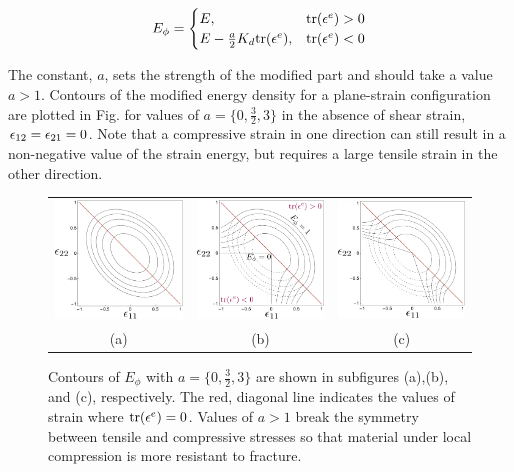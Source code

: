 \begin{align}\label{eq:modified_strain_energy_density}
	E_{\phi} = 
	\begin{cases}
	E, & \text{tr}(\epsilon^e) > 0 \\
	E - \frac{a}{2} K_d \text{tr}(\epsilon^e), & \text{tr}(\epsilon^e) < 0	
	\end{cases}
\end{align}


The constant, $a$, sets the strength of the modified part and should take a value $a>1$. Contours of the modified energy density for a plane-strain configuration are plotted in Fig. for values of $a=\{0,\tfrac{3}{2},3\}$ in the absence of shear strain, $\epsilon_{12}=\epsilon_{21}=0$. Note that a compressive strain in one direction can still result in a non-negative value of the strain energy, but requires a large tensile strain in the other direction.


\begin{figure}[h!]
	\begin{center}
	\begin{tabular}{ccc}
		\includegraphics[width=0.3\columnwidth]{ch-fracture/asymmetric_energy/plot_0} &
		\includegraphics[width=0.3\columnwidth]{ch-fracture/asymmetric_energy/plot_15} &
		\includegraphics[width=0.3\columnwidth]{ch-fracture/asymmetric_energy/plot_3}  \\
		(a) & (b) & (c)
	\end{tabular}
	\caption{Contours of $E_{\phi}$ with $a=\{0,\tfrac{3}{2},3\}$ are shown in subfigures (a),(b), and (c), respectively. The red, diagonal line indicates the values of strain where $\text{tr}(\epsilon^e)=0$. Values of $a>1$ break the symmetry between tensile and compressive stresses so that material under local compression is more resistant to fracture.}
	\label{fig:dihedral_angles}
	\end{center}
\end{figure}


